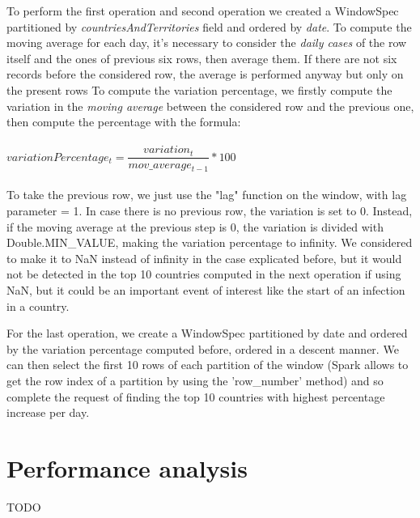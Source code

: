 \documentclass[10pt]{article}
\begin{document}
	To perform the first operation and second operation we created a WindowSpec partitioned by \textit{countriesAndTerritories} field and ordered by \textit{date}. To compute the moving average for each day, it's necessary to consider the \textit{daily cases} of the row itself and the ones of previous six rows, then average them. If there are not six records before the considered row, the average is performed anyway but only on the present rows
	To compute the variation percentage, we firstly compute the variation in the \textit{moving average} between the considered row and the previous one, then compute the percentage with the formula:\\\\
	$ variationPercentage_{t} = \dfrac{variation_{t}}{mov\_average_{t-1}} * 100$\\\\
	To take the previous row, we just use the "lag" function on the window, with lag parameter = 1. In case there is no previous row, the variation is set to 0. Instead, if the moving average at the previous step is 0, the variation is divided with Double.MIN\_VALUE, making the variation percentage to infinity. We considered to make it to NaN instead of infinity in the case explicated before, but it would not be detected in the top 10 countries computed in the next operation if using NaN, but it could be an important event of interest like the start of an infection in a country.
	
	For the last operation, we create a WindowSpec partitioned by date and ordered by the variation percentage computed before, ordered in a descent manner. We can then select the first 10 rows of each partition of the window (Spark allows to get the row index of a partition by using the 'row\_number' method) and so complete the request of finding the top 10 countries with highest percentage increase per day.
	
	\section{Performance analysis}
	TODO
	
\end{document}
